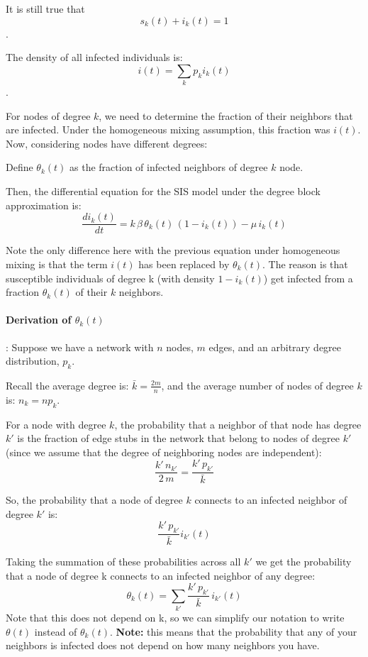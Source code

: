 \documentclass[11pt]{scrartcl} %
\begin{document}
It is still true that \[ s_k(t) + i_k(t)=1 \]. 

The density of all infected individuals is:
\[ i(t) = \sum_k p_k i_k(t) \].

For nodes of degree $k$, we need to determine the fraction of their neighbors that are infected. Under the homogeneous mixing assumption, this fraction was $i(t)$. Now, considering nodes have different degrees:

Define $\theta_k(t)$ as the fraction of infected neighbors of degree $k$ node. 

Then, the differential equation for the SIS model under the degree block approximation is:
\[\frac{di_k(t)}{dt} = k \, \beta \, \theta_k(t)\, (1-i_k(t)) - \mu\, i_k(t)\]

Note the only difference here with the previous equation under homogeneous mixing is that the term $i(t)$ has been replaced by $\theta_k(t)$. The reason is that susceptible individuals of degree k (with density $1-i_k(t)$) get infected from a fraction $\theta_k(t)$ of their $k$ neighbors.

\paragraph{Derivation of $\theta_k(t)$}: Suppose we have a network with $n$ nodes, $m$ edges, and an arbitrary degree distribution, $p_k$.

Recall the average degree is: $\bar{k} = \frac{2m}{n}$, and the average number of nodes of degree $k$ is: $n_k = n p_k$.

For a node with degree $k$, the probability that a neighbor of that node has degree $k'$ is the fraction of edge stubs in the network that belong to nodes of degree $k'$ (since we assume that the degree of neighboring nodes are independent):
\[ \frac{k' \, n_{k'}}{2 \, m} = \frac{k' \, p_{k'}}{\bar{k}} \]

So, the probability that a node of degree $k$ connects to an infected neighbor of degree $k'$ is:
\[ \frac{k' \, p_{k'}}{\bar{k}} i_{k'}(t) \] 

Taking the summation of these probabilities across all $k'$ we get the probability that a node of degree k connects to an infected neighbor of any degree:
\[ \theta_k(t) = \sum_{k'} \frac{k' \, p_{k'}}{\bar{k}} \, i_{k'}(t) \]
Note that this does not depend on k, so we can simplify our notation to write $\theta(t)$ instead of $\theta_k(t)$. \textbf{Note:} this means that the probability that any of your neighbors is infected does not depend on how many neighbors you have.
\end{document}
